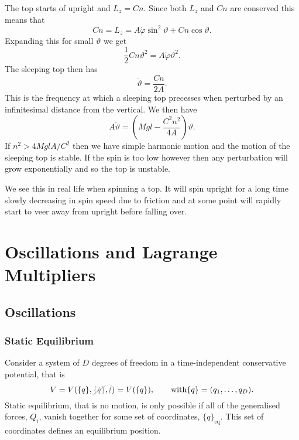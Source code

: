 \documentclass[fleqn]{NotesClass}
\newcommand*{\nodependence}[1]{\textcolor{gray}{\cancel{#1}}}
\begin{document}
    The top starts of upright and \(L_z = Cn\).
    Since both \(L_z\) and \(Cn\) are conserved this means that
    \begin{equation}
        Cn = L_z = A \dot{\varphi}\sin^2\vartheta + Cn\cos\vartheta.
    \end{equation}
    Expanding this for small \(\vartheta\) we get
    \begin{equation}
        \frac{1}{2}Cn\vartheta^2 = A\dot{\varphi}\vartheta^2.
    \end{equation}
    The sleeping top then has
    \begin{equation}
        \dot{\vartheta} = \frac{Cn}{2A}.
    \end{equation}
    This is the frequency at which a sleeping top precesses when perturbed by an infinitesimal distance from the vertical.
    We then have
    \begin{equation}
        A\ddot{\vartheta} = \left( Mgl - \frac{C^2n^2}{4A} \right)\vartheta.
    \end{equation}
    If \(n^2 > 4MglA/C^2\) then we have simple harmonic motion and the motion of the sleeping top is stable.
    If the spin is too low however then any perturbation will grow exponentially and so the top is unstable.
    
    We see this in real life when spinning a top.
    It will spin upright for a long time slowly decreasing in spin speed due to friction and at some point will rapidly start to veer away from upright before falling over.
    
    \part{Oscillations and Lagrange Multipliers}
    \chapter{Oscillations}
    \section{Static Equilibrium}
    Consider a system of \(D\) degrees of freedom in a time-independent conservative potential, that is
    \begin{equation}
        V = V(\{q\}, \nodependence{\{\dot{q}\}}, \nodependence{t}) = V(\{q\}), \qquad\text{with} \{q\} = (q_1, \dotsc, q_D).
    \end{equation}
    Static equilibrium, that is no motion, is only possible if all of the generalised forces, \(Q_i\), vanish together for some set of coordinates, \(\{q\}_{\mathrm{eq}}\).
    This set of coordinates defines an equilibrium position.
    
\end{document}
